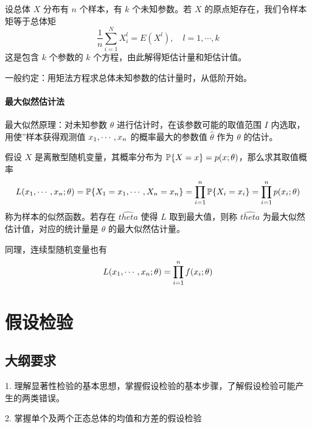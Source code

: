 设总体 $X$ 分布有 $n$ 个样本，有 $k$ 个未知参数。若 $X$ 的原点矩存在，我们令样本矩等于总体矩
\[ \frac{1}{n} \sum_{i=1}^{N} X_i^l = E(X^l), \quad l = 1, \cdots, k \]
这是包含 $k$ 个参数的 $k$ 个方程，由此解得矩估计量和矩估计值。

一般约定：用矩法方程求总体未知参数的估计量时，从低阶开始。

\paragraph{最大似然估计法}

最大似然原理：对未知参数 $\theta$ 进行估计时，在该参数可能的取值范围 $I$ 内选取，用使”样本获得观测值 $x_1,\cdots,x_n$ 的概率最大的参数值 $\hat{\theta}$ 作为 $\theta$ 的估计。

假设 $X$ 是离散型随机变量，其概率分布为 $\mathbb{P}\{X = x\} = p(x; \theta)$，那么求其取值概率
\[ L(x_1,\cdots,x_n;\theta) = \mathbb{P}\{X_1 = x_1, \cdots, X_n = x_n\} = \prod_{i=1}^n \mathbb{P}\{X_i=x_i\} = \prod_{i=1}^n p(x_i; \theta) \]
称为样本的似然函数。若存在 $\hat{theta}$ 使得 $L$ 取到最大值，则称 $\hat{theta}$ 为最大似然估计值，对应的统计量是 $\theta$ 的最大似然估计量。

同理，连续型随机变量也有
\[ L(x_1,\cdots,x_n; \theta) = \prod_{i=1}^n f(x_i; \theta) \]


\section{假设检验}

\subsection{大纲要求}

1. 理解显著性检验的基本思想，掌握假设检验的基本步骤，了解假设检验可能产生的两类错误。

2. 掌握单个及两个正态总体的均值和方差的假设检验
